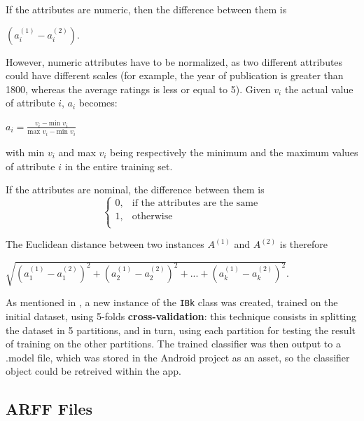\documentclass{mproj}
\begin{document}
If the attributes are numeric, then the difference between them is 
\begin{center}
	$(a_i^{(1)} - a_i^{(2)})$.
\end{center}

However, numeric attributes have to be normalized, as two different attributes could have different scales (for example, the year of publication is greater than 1800, whereas the average ratings is less or equal to 5). Given $v_i$ the actual value of attribute $i$, $a_i$ becomes:
\begin{center}
	$a_i = \frac{v_i - \text{min } v_i}{\text{max } v_i - \text{min } v_i}$
\end{center}
with min $v_i$ and max $v_i$ being respectively the minimum and the maximum values of attribute $i$ in the entire training set. 

If the attributes are nominal, the difference between them is
\begin{equation}
	\begin{cases}
		0, & \text{if the attributes are the same}\\
		1, & \text{otherwise}\\
	\end{cases}
\end{equation}

The Euclidean distance between two instances $A^{(1)}$ and $A^{(2)}$ is therefore
\begin{center}
	$\sqrt{(a_1^{(1)} - a_1^{(2)})^2 + (a_2^{(1)} - a_2^{(2)})^2 + ... + (a_k^{(1)} - a_k^{(2)})^2}$.
\end{center}

As mentioned in , a new instance of the \verb|IBk| class was created, trained on the initial dataset, using 5-folds \textbf{cross-validation}: this technique consists in splitting the dataset in 5 partitions, and in turn, using each partition for testing the result of training on the other partitions. \cite[Chapter~5]{wekabook} The trained classifier was then output to a .model file, which was stored in the Android project as an asset, so the classifier object could be retreived within the app.

\subsection*{ARFF Files}
\end{document}
